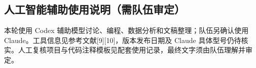 \subsection*{人工智能辅助使用说明（需队伍审定）}
本轮使用 Codex 辅助模型讨论、编程、数据分析和文稿整理；队伍另确认使用 Claude。工具信息见参考文献[9][10]，版本发布日期及 Claude 具体型号仍待核实。人工复核项目与代码注释模板见配套使用记录，最终文字须由队伍理解并审定。

